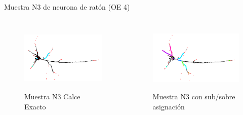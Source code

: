 \begin{frame}{Muestra N3 de neurona de rat\'on (OE 4)}
    \vspace{-0.2cm}
        \begin{columns}
        \begin{column}{0.45\textwidth}
            \begin{figure}
                \centering
                \includegraphics[height=1.3in]{Pictures/Porta18-3a1-phil-s10-v056-exactMatch-antLabeled.png}
                \caption{Muestra N3 Calce Exacto}
            \end{figure}
        \end{column}
        \begin{column}{0.45\textwidth}
            \begin{figure}
                \centering
                \includegraphics[height=1.3in]{Pictures/Porta18-3a1-phil-s10-v056-overmatches-3-antLabeled.png}
                \caption{Muestra N3 con sub/sobre asignaci\'on}
            \end{figure}
        \end{column}
    \end{columns}
    
    \begin{table}[h]
        \caption{(*) indica el mejor resultado de las 5 iteraciones}
    \end{table}
\end{frame}

